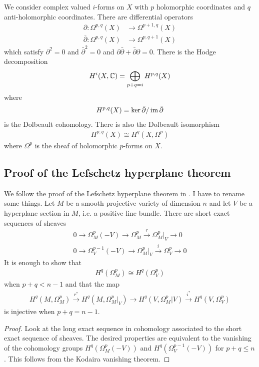 \documentclass[12pt]{article}
\begin{document}
We consider complex valued $i$-forms on $X$ with $p$ holomorphic 
coordinates and $q$
anti-holomorphic coordinates. There are differential operators 
\begin{align*}
    \partial: \Omega^{p,q}(X) &\to \Omega^{p+1,q}(X)\\
    \bar{\partial}: \Omega^{p,q}(X) &\to \Omega^{p,q+1}(X)
\end{align*} which satisfy $\partial^2 = 0$ and
$\bar{\partial}^2 = 0$ and $\partial\bar{\partial} + \bar{\partial}\partial = 0$.
There is the Hodge decomposition \begin{align*}
    H^i(X,\mathbb{C}) = \bigoplus_{p+q = i} H^{p,q}(X)
\end{align*} where 
\begin{align*}
    H^{p,q}(X) = \ker \bar{\partial} / \operatorname{im} \bar{\partial}
\end{align*} is the Dolbeault cohomology. There is also the 
Dolbeault isomorphism \begin{align*}
    H^{p,q}(X) \cong H^q(X,\Omega^p)
\end{align*} where $\Omega^p$ is the sheaf of holomorphic $p$-forms on $X$.

\subsection{Proof of the Lefschetz hyperplane theorem}
We follow the proof of the Lefschetz hyperplane theorem in \cite{griffiths-harris}.
I have to rename some things. Let $M$ be a smooth projective variety of dimension $n$ and let $V$ be a
hyperplane section in $M$, i.e. a positive line bundle. There are short exact sequences of sheaves \begin{align*}
    0 \to \Omega^p_M(-V) \to \Omega^p_M \xrightarrow{r} \Omega^p_M\vert_V \to 0 \\
    0 \to \Omega^{p-1}_V(-V) \to \Omega^p_M\vert_V \xrightarrow{i} \Omega^p_V \to 0
\end{align*}
It is enough to show that 
\begin{align*}
    H^q(\Omega^p_M) \cong H^q(\Omega^p_V)
\end{align*} when $p+q < n-1$ and that the map \begin{align*}
    H^q(M,\Omega^p_M) \xrightarrow{r^*} H^q(M,\Omega^p_M\vert_V) \to H^q(V,\Omega^p_M\vert V) \xrightarrow{i^*} H^q(V,\Omega^p_V)
\end{align*} is injective when $p+q = n-1$.
\begin{proof}
    Look at the long exact sequence in cohomology associated to the short exact sequence of sheaves. 
    The desired properties are equivalent to the vanishing of the cohomology groups $H^q(\Omega^p_M(-V))$ and
    $H^q(\Omega^{p-1}_V(-V))$ for $p+q \leq n$. This follows from the Kodaira vanishing theorem.
\end{proof}
\end{document}
